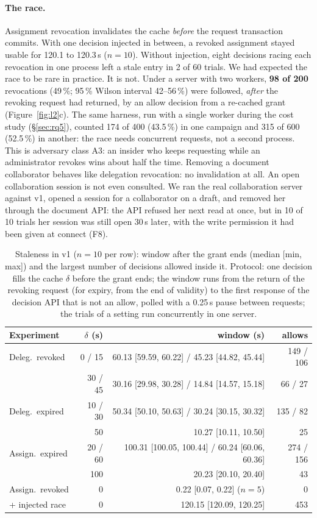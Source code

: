 \documentclass[sigconf,review,anonymous]{acmart}
\begin{document}
\paragraph{The race.} Assignment revocation invalidates the cache \emph{before} the request transaction commits.
With one decision injected in between, a revoked assignment stayed usable for 120.1 to 120.3\,s ($n=10$).
Without injection, eight decisions racing each revocation in one process left a stale entry in 2 of 60 trials.
We had expected the race to be rare in practice. It is not. Under a server with two workers, \textbf{98 of 200}
revocations (49\,\%; 95\,\% Wilson interval 42--56\,\%) were followed, \emph{after} the revoking request had returned, by an allow decision from a
re-cached grant (Figure~\ref{fig:l2}c). The same harness, run with a single worker during the cost study
(\S\ref{sec:rq5}), counted 174 of 400 (43.5\,\%) in one campaign and 315 of 600 (52.5\,\%) in another: the race
needs concurrent requests, not a second process.
This is adversary class A3: an insider who keeps requesting while an
administrator revokes wins about half the time. Removing a document collaborator behaves like delegation
revocation: no invalidation at all. An open collaboration session is not even consulted. We ran the real
collaboration server against v1, opened a session for a collaborator on a draft, and removed her through the
document API: the API refused her next read at once, but in 10 of 10 trials her session was still open 30\,s
later, with the write permission it had been given at connect (F8).

\begin{table}[t]
\caption{Staleness in v1 ($n=10$ per row): window after the grant ends (median [min, max]) and the largest number
of decisions allowed inside it. Protocol: one decision fills the cache $\delta$ before the grant ends; the window
runs from the return of the revoking request (for expiry, from the end of validity) to the first response of the
decision API that is not an allow, polled with a 0.25\,s pause between requests; the trials of a setting run
concurrently in one server.}
\label{tab:e2}
\footnotesize
\begin{tabular}{@{}l@{\;}r@{\;\;}r@{\;\;}r@{}}
\toprule
Experiment & $\delta$ (s) & window (s) & allows \\
\midrule
Deleg.\ revoked & 0 / 15 & 60.13 [59.59, 60.22] / 45.23 [44.82, 45.44] & 149 / 106 \\
 & 30 / 45 & 30.16 [29.98, 30.28] / 14.84 [14.57, 15.18] & 66 / 27 \\
Deleg.\ expired & 10 / 30 & 50.34 [50.10, 50.63] / 30.24 [30.15, 30.32] & 135 / 82 \\
 & 50 & 10.27 [10.11, 10.50] & 25 \\
Assign.\ expired & 20 / 60 & 100.31 [100.05, 100.44] / 60.24 [60.06, 60.36] & 274 / 156 \\
 & 100 & 20.23 [20.10, 20.40] & 43 \\
Assign.\ revoked & 0 & 0.22 [0.07, 0.22] ($n=5$) & 0 \\
\quad + injected race & 0 & 120.15 [120.09, 120.25] & 453 \\
\bottomrule
\end{tabular}
\end{table}
\end{document}
